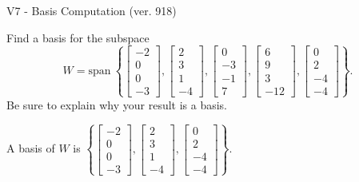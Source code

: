 \begin{exercise}
  \begin{exerciseTitle}V7 - Basis Computation (ver. 918)\end{exerciseTitle}
  \begin{exerciseStatement}
    Find a basis for the subspace 
\[W=\mathrm{span}\ \left\{\left[\begin{array}{r}
-2 \\
0 \\
0 \\
-3
\end{array}\right] , \left[\begin{array}{r}
2 \\
3 \\
1 \\
-4
\end{array}\right] , \left[\begin{array}{r}
0 \\
-3 \\
-1 \\
7
\end{array}\right] , \left[\begin{array}{r}
6 \\
9 \\
3 \\
-12
\end{array}\right] , \left[\begin{array}{r}
0 \\
2 \\
-4 \\
-4
\end{array}\right]\right\}.\]
 Be sure to explain why your result is a basis.


  \end{exerciseStatement}
  \begin{exerciseAnswer}
   A basis of \(W\) is  \(\left\{\left[\begin{array}{r}
-2 \\
0 \\
0 \\
-3
\end{array}\right] , \left[\begin{array}{r}
2 \\
3 \\
1 \\
-4
\end{array}\right] , \left[\begin{array}{r}
0 \\
2 \\
-4 \\
-4
\end{array}\right]\right\}\).
  


  \end{exerciseAnswer}
\end{exercise}